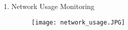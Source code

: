 \documentclass{article}
\begin{document}
\begin{enumerate}
\begin{enumerate}
                    \item{Network Usage Monitoring}
                    \begin{figure}[H]
                    	\centering
                        \texttt{[image: network\_usage.JPG]}
                        \newline
                        \newline
                    \end{figure}
                    
            	\end{enumerate}
        \end{enumerate}
\end{document}
